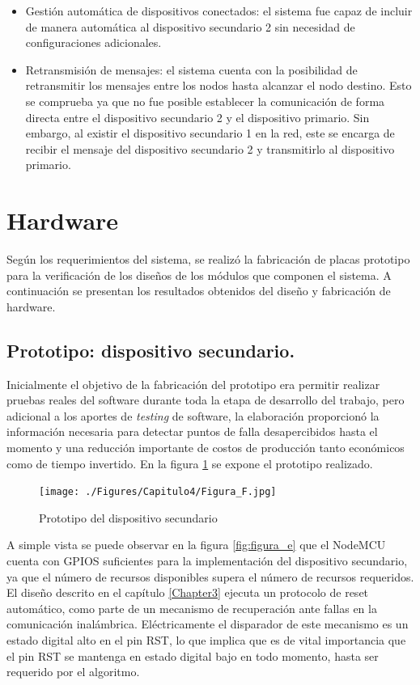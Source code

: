 \begin{itemize}
\item Gestión automática de dispositivos conectados: el sistema fue capaz de incluir de manera automática al dispositivo secundario 2 sin necesidad de configuraciones adicionales.
\item Retransmisión de mensajes: el sistema cuenta con la posibilidad de retransmitir los mensajes entre los nodos hasta alcanzar el nodo destino. Esto se comprueba ya que no fue posible establecer la comunicación de forma directa entre el dispositivo secundario 2 y el dispositivo primario. Sin embargo, al existir el dispositivo secundario 1 en la red, este se encarga de recibir el mensaje del dispositivo secundario 2 y transmitirlo al dispositivo primario.
\end{itemize}


\section{Hardware}

Según los requerimientos del sistema, se realizó la fabricación de placas prototipo para la verificación de los diseños de los módulos que componen el sistema. A continuación se presentan los resultados obtenidos del diseño y fabricación de hardware.  

\subsection{Prototipo: dispositivo secundario.}

Inicialmente el objetivo de la fabricación del prototipo era permitir realizar pruebas reales del software durante toda la etapa de desarrollo del trabajo, pero adicional a los aportes de \textit{testing} de software, la elaboración proporcionó la información necesaria para detectar puntos de falla desapercibidos hasta el momento y una reducción importante de costos de producción tanto económicos como de tiempo invertido. En la figura \ref{fig:figura_f} se expone el prototipo realizado.  


\begin{figure}[ht]
	\centering
	\texttt{[image: ./Figures/Capitulo4/Figura\_F.jpg]}
	\caption{Prototipo del dispositivo secundario}
	\label{fig:figura_f}
\end{figure}


A simple vista se puede observar en la figura \ref{fig:figura_e} que el NodeMCU cuenta con GPIOS suficientes para la implementación del dispositivo secundario, ya que el número de recursos disponibles supera el número de recursos requeridos. El diseño descrito en el capítulo \ref{Chapter3} ejecuta un protocolo de reset automático, como parte de un mecanismo de  recuperación ante fallas en la comunicación inalámbrica. Eléctricamente el disparador de este mecanismo es un estado digital alto en el pin RST, lo que implica que es de vital importancia que el pin RST se mantenga en estado digital bajo en todo momento, hasta ser requerido por el algoritmo.

